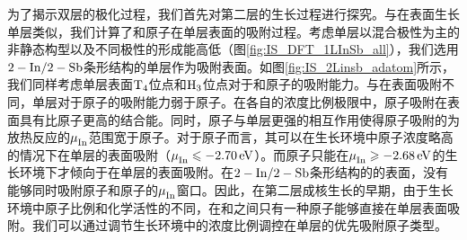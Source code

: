 为了揭示双层的极化过程，我们首先对第二层的生长过程进行探究。与在表面生长单层类似，我们计算了和原子在单层表面的吸附过程。考虑单层以混合极性为主的非静态构型以及不同极性的形成能高低（图\ref{fig:IS_DFT_1LInSb_all}），我们选用$\rm 2-In/2-Sb$条形结构的单层作为吸附表面。如图\ref{fig:IS_2Linsb_adatom}所示，我们同样考虑单层表面$\rm T_{4} \it$位点和$\rm H_{3} \it$位点对于和原子的吸附能力。与在表面吸附不同，单层对于原子的吸附能力弱于原子。在各自的浓度比例极限中，原子吸附在表面具有比原子更高的结合能。同时，原子与单层更强的相互作用使得原子吸附的为放热反应的$\it \mu_{\rm In}^{\rm } \it$范围宽于原子。对于原子而言，其可以在生长环境中原子浓度略高的情况下在单层的表面吸附（$\it \mu_{\rm In}^{\rm } \it\leqslant \SI{-2.70}{\electronvolt}$）。而原子只能在$\it \mu_{\rm In}^{\rm } \it \geqslant \SI{-2.68}{\electronvolt}$的生长环境下才倾向于在单层的表面吸附。在$\rm 2-In/2-Sb$条形结构的的表面，没有能够同时吸附原子和原子的$\it \mu_{\rm In}^{\rm } \it$窗口。因此，在第二层成核生长的早期，由于生长环境中原子比例和化学活性的不同，在和之间只有一种原子能够直接在单层表面吸附。我们可以通过调节生长环境中的浓度比例调控在单层的优先吸附原子类型。

